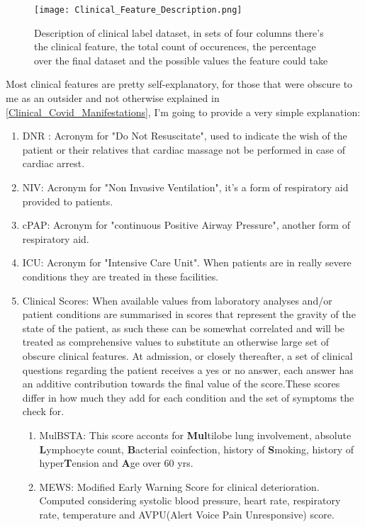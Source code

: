 \begin{figure}[H]
  		\texttt{[image: Clinical\_Feature\_Description.png]}
        \caption{Description of clinical label dataset, in sets of four columns there's the clinical feature, the total count of occurences, the percentage over the final dataset and the possible values the feature could take \label{fig:ClinicalFeatures}}
\end{figure}

Most clinical features are pretty self-explanatory, for those that were obscure to me as an outsider and not otherwise explained in \ref{Clinical_Covid_Manifestations}, I'm going to provide a very simple explanation:

\begin{enumerate}\label{clinical_features}
\item DNR : Acronym for "Do Not Resuscitate", used to indicate the wish of the patient or their relatives that cardiac massage not be performed in case of cardiac arrest. 
\item NIV: Acronym for "Non Invasive Ventilation", it's a form of respiratory aid provided to patients.
\item cPAP: Acronym for  "continuous Positive Airway Pressure", another form of respiratory aid.
\item ICU: Acronym for "Intensive Care Unit". When patients are in really severe conditions they are treated in these facilities.
\item Clinical Scores: When available values from laboratory analyses and/or patient conditions are summarised in scores that represent the gravity of the state of the patient, as such these can be somewhat correlated and will be treated as comprehensive values to substitute an otherwise large set of obscure clinical features. At admission, or closely thereafter, a set of clinical questions regarding the patient receives a yes or no answer, each answer has an additive contribution towards the final value of the score.These scores differ in how much they add for each condition and the set of symptoms the check for.
	\begin{enumerate}
		\item MulBSTA: This score acconts for \textbf{Mul}tilobe lung involvement, absolute \textbf{L}ymphocyte count, \textbf{B}acterial coinfection, history of \textbf{S}moking, history of hyper\textbf{T}ension and \textbf{A}ge over 60 yrs. \cite{MulBSTA}
		\item MEWS: Modified Early Warning Score for clinical deterioration. Computed considering systolic blood pressure, heart rate, respiratory rate, temperature and AVPU(Alert Voice Pain Unresponsive) score. \cite{MEWS}

\end{enumerate}
\end{enumerate}
